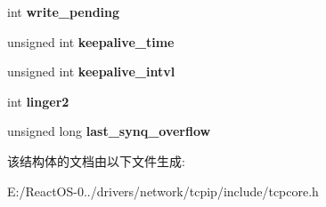 \begin{DoxyCompactItemize}
int {\bfseries write\+\_\+pending}
\item 
\mbox{\label{structtcp__opt_a8322d8e3f787a6ab68ab88f57621c260}} 
unsigned int {\bfseries keepalive\+\_\+time}
\item 
\mbox{\label{structtcp__opt_a56ff798c9558fa4f5580dea489d9d8e5}} 
unsigned int {\bfseries keepalive\+\_\+intvl}
\item 
\mbox{\label{structtcp__opt_a9c51d1e6c3b711b588b3c3bdb5a87ea1}} 
int {\bfseries linger2}
\item 
\mbox{\label{structtcp__opt_ae08bc8a13df9dd098bd60e1fc6fb90d6}} 
unsigned long {\bfseries last\+\_\+synq\+\_\+overflow}
\end{DoxyCompactItemize}


该结构体的文档由以下文件生成\+:\begin{DoxyCompactItemize}
\item 
E\+:/\+React\+O\+S-\/0../drivers/network/tcpip/include/tcpcore.\+h\end{DoxyCompactItemize}
